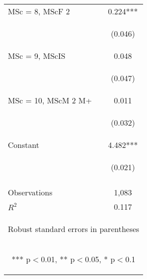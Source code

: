 \begin{center}
\begin{tabular}{lc}
MSc = 8, MScF 2 & 0.224*** \\
\vspace{4pt} & \begin{footnotesize}(0.046)\end{footnotesize} \\
MSc = 9, MScIS & 0.048 \\
\vspace{4pt} & \begin{footnotesize}(0.047)\end{footnotesize} \\
MSc = 10, MScM 2 M+ & 0.011 \\
\vspace{4pt} & \begin{footnotesize}(0.032)\end{footnotesize} \\
Constant & 4.482*** \\
 & \begin{footnotesize}(0.021)\end{footnotesize} \\
\vspace{4pt} & \begin{footnotesize}\end{footnotesize} \\
Observations & 1,083 \\
 $R^2$ & 0.117 \\ \hline
\multicolumn{2}{c}{\begin{footnotesize} Robust standard errors in parentheses\end{footnotesize}} \\
\multicolumn{2}{c}{\begin{footnotesize} *** p$<$0.01, ** p$<$0.05, * p$<$0.1\end{footnotesize}} \\
\end{tabular}
\end{center}
